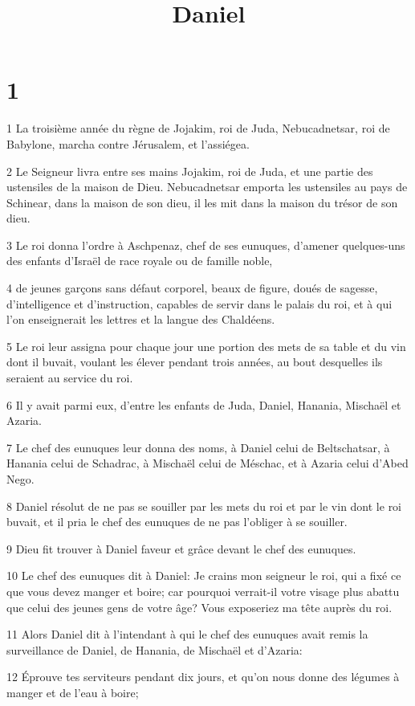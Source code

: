 

\title{Daniel}


\chapter{1}

\par 1 La troisième année du règne de Jojakim, roi de Juda, Nebucadnetsar, roi de Babylone, marcha contre Jérusalem, et l'assiégea.
\par 2 Le Seigneur livra entre ses mains Jojakim, roi de Juda, et une partie des ustensiles de la maison de Dieu. Nebucadnetsar emporta les ustensiles au pays de Schinear, dans la maison de son dieu, il les mit dans la maison du trésor de son dieu.
\par 3 Le roi donna l'ordre à Aschpenaz, chef de ses eunuques, d'amener quelques-uns des enfants d'Israël de race royale ou de famille noble,
\par 4 de jeunes garçons sans défaut corporel, beaux de figure, doués de sagesse, d'intelligence et d'instruction, capables de servir dans le palais du roi, et à qui l'on enseignerait les lettres et la langue des Chaldéens.
\par 5 Le roi leur assigna pour chaque jour une portion des mets de sa table et du vin dont il buvait, voulant les élever pendant trois années, au bout desquelles ils seraient au service du roi.
\par 6 Il y avait parmi eux, d'entre les enfants de Juda, Daniel, Hanania, Mischaël et Azaria.
\par 7 Le chef des eunuques leur donna des noms, à Daniel celui de Beltschatsar, à Hanania celui de Schadrac, à Mischaël celui de Méschac, et à Azaria celui d'Abed Nego.
\par 8 Daniel résolut de ne pas se souiller par les mets du roi et par le vin dont le roi buvait, et il pria le chef des eunuques de ne pas l'obliger à se souiller.
\par 9 Dieu fit trouver à Daniel faveur et grâce devant le chef des eunuques.
\par 10 Le chef des eunuques dit à Daniel: Je crains mon seigneur le roi, qui a fixé ce que vous devez manger et boire; car pourquoi verrait-il votre visage plus abattu que celui des jeunes gens de votre âge? Vous exposeriez ma tête auprès du roi.
\par 11 Alors Daniel dit à l'intendant à qui le chef des eunuques avait remis la surveillance de Daniel, de Hanania, de Mischaël et d'Azaria:
\par 12 Éprouve tes serviteurs pendant dix jours, et qu'on nous donne des légumes à manger et de l'eau à boire;
